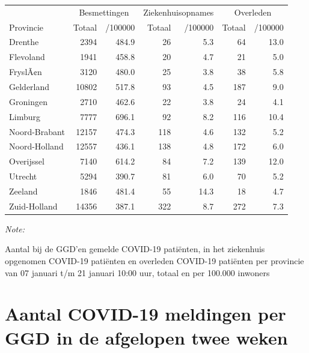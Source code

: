 \documentclass[
  english,
  man,floatsintext]{apa6}
\begin{document}
\begin{table}[H]
\centering
\begin{threeparttable}
\begin{tabular}{lrrrrrr}
\toprule
\multicolumn{1}{c}{ } & \multicolumn{2}{c}{Besmettingen} & \multicolumn{2}{c}{Ziekenhuisopnames} & \multicolumn{2}{c}{Overleden} \\
\cmidrule(l{3pt}r{3pt}){2-3} \cmidrule(l{3pt}r{3pt}){4-5} \cmidrule(l{3pt}r{3pt}){6-7}
Provincie & Totaal & /100000 & Totaal & /100000 & Totaal & /100000\\
\midrule
Drenthe & 2394 & 484.9 & 26 & 5.3 & 64 & 13.0\\
Flevoland & 1941 & 458.8 & 20 & 4.7 & 21 & 5.0\\
FryslÃ¢n & 3120 & 480.0 & 25 & 3.8 & 38 & 5.8\\
Gelderland & 10802 & 517.8 & 93 & 4.5 & 187 & 9.0\\
Groningen & 2710 & 462.6 & 22 & 3.8 & 24 & 4.1\\
Limburg & 7777 & 696.1 & 92 & 8.2 & 116 & 10.4\\
Noord-Brabant & 12157 & 474.3 & 118 & 4.6 & 132 & 5.2\\
Noord-Holland & 12557 & 436.1 & 138 & 4.8 & 172 & 6.0\\
Overijssel & 7140 & 614.2 & 84 & 7.2 & 139 & 12.0\\
Utrecht & 5294 & 390.7 & 81 & 6.0 & 70 & 5.2\\
Zeeland & 1846 & 481.4 & 55 & 14.3 & 18 & 4.7\\
Zuid-Holland & 14356 & 387.1 & 322 & 8.7 & 272 & 7.3\\
\bottomrule
\end{tabular}
\begin{tablenotes}
\item \textit{Note: } 
\item Aantal bij de GGD’en gemelde COVID-19 patiënten, in het ziekenhuis opgenomen COVID-19 patiënten en overleden COVID-19 patiënten per provincie van 07 januari t/m 21 januari 10:00 uur, totaal en per 100.000 inwoners
\end{tablenotes}
\end{threeparttable}
\end{table}

\newpage

\hypertarget{aantal-covid-19-meldingen-per-ggd-in-de-afgelopen-twee-weken}{%
\section{Aantal COVID-19 meldingen per GGD in de afgelopen twee weken}\label{aantal-covid-19-meldingen-per-ggd-in-de-afgelopen-twee-weken}}
\end{document}
